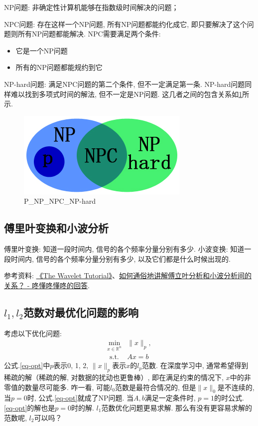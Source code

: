 NP问题: 非确定性计算机能够在指数级时间解决的问题；

NPC问题: 存在这样一个NP问题, 所有NP问题都能约化成它, 即只要解决了这个问题则所有NP问题都能解决. NPC需要满足两个条件: 
\begin{itemize}
	\item 它是一个NP问题
	\item 所有的NP问题都能规约到它
\end{itemize}

NP-hard问题: 满足NPC问题的第二个条件, 但不一定满足第一条. NP-hard问题同样难以找到多项式时间的解法, 但不一定是NP问题. 这几者之间的包含关系如\ref{fig:P-NP-NPC-NP-hard}所示. 

\begin{figure}[h]
	\centering
	\includegraphics[width=.4\textwidth]{pics/P-NP-NPC-NP-hard.jpeg}
	\caption{P\_NP\_NPC\_NP-hard}
	\label{fig:P-NP-NPC-NP-hard}
\end{figure}



\subsection{傅里叶变换和小波分析}
傅里叶变换: 知道一段时间内, 信号的各个频率分量分别有多少. 
小波变换: 知道一段时间内, 信号的各个频率分量分别有多少, 以及它们都是什么时候出现的. 

参考资料: \href{https://cseweb.ucsd.edu/~baden/Doc/wavelets/polikar_wavelets.pdf}{《The Wavelet Tutorial》}、\href{https://www.zhihu.com/question/22864189/answer/40772083}{如何通俗地讲解傅立叶分析和小波分析间的关系？ - 咚懂咚懂咚的回答}. 

\subsection{$l_1, l_2$范数对最优化问题的影响}
考虑以下优化问题: 
\begin{equation}
	\begin{aligned}
		\min _{x \in \mathbb{R}^{n}} &\|x\|_{p}, \\
		\text { s.t. } & A x=b \label{eq-opt}
	\end{aligned}
\end{equation}
公式.\ref{eq-opt}中$p$表示0, 1, 2, $\|x\|_{p}$表示$x$的$l_p$范数. 
在深度学习中, 通常希望得到稀疏的解（稀疏的解, 对数据的扰动也更鲁棒）, 即在满足约束的情况下, $x$中的非零值的数量尽可能多. 咋一看, 可能$l_0$范数是最符合情况的, 但是$\|x\|_0$是不连续的, 当$p=0$时, 公式.\ref{eq-opt}就成了NP问题. 当$A, b$满足一定条件时, $p=1$的时公式.\ref{eq-opt}的解也是$p=0$时的解. $l_1$范数优化问题更易求解. 那么有没有更容易求解的范数呢, $l_2$可以吗？

